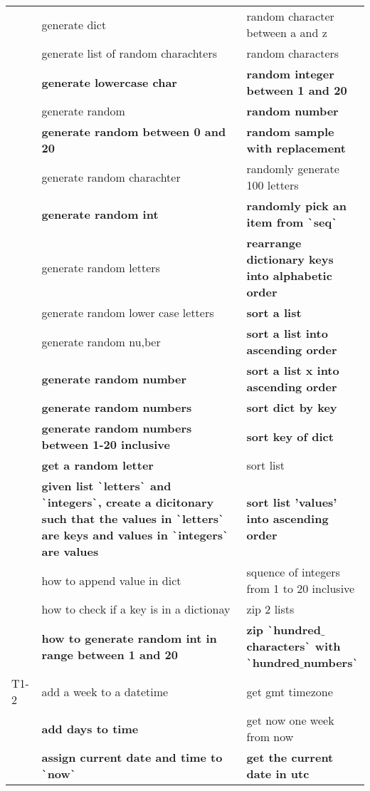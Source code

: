 \begin{longtable}{lLL}
& generate dict & random character between a and z \\
& generate list of random charachters & random characters \\
& \textbf{generate lowercase char} & \textbf{random integer between 1 and 20} \\
& generate random & \textbf{random number} \\
& \textbf{generate random between 0 and 20} & \textbf{random sample with replacement} \\
& generate random charachter & randomly generate 100 letters \\
& \textbf{generate random int} & \textbf{randomly pick an item from \texttt{\`}seq\texttt{\`}} \\
& generate random letters & \textbf{rearrange dictionary keys into alphabetic order} \\
& generate random lower case letters & \textbf{sort a list} \\
& generate random nu,ber & \textbf{sort a list into ascending order} \\
& \textbf{generate random number} & \textbf{sort a list x into ascending order} \\
& \textbf{generate random numbers} & \textbf{sort dict by key} \\
& \textbf{generate random numbers between 1-20 inclusive} & \textbf{sort key of dict} \\
& \textbf{get a random letter} & sort list \\
& \textbf{given list \texttt{\`}letters\texttt{\`} and \texttt{\`}integers\texttt{\`}, create a dicitonary such that the values in \texttt{\`}letters\texttt{\`} are keys and values in \texttt{\`}integers\texttt{\`} are values} & \textbf{sort list 'values' into ascending order} \\
& how to append value in dict & squence of integers from 1 to 20 inclusive \\
& how to check if a  key is in a dictionay & zip 2 lists \\
& \textbf{how to generate random int in range between 1 and 20} & \textbf{zip \texttt{\`}hundred$\_$characters\texttt{\`} with \texttt{\`}hundred$\_$numbers\texttt{\`}} \\
T1-2 & add a week to a datetime & get gmt timezone \\
& \textbf{add days to time} & get now one week from now \\
& \textbf{assign current date and time to \texttt{\`}now\texttt{\`}} & \textbf{get the current date in utc} \\

\end{longtable}
